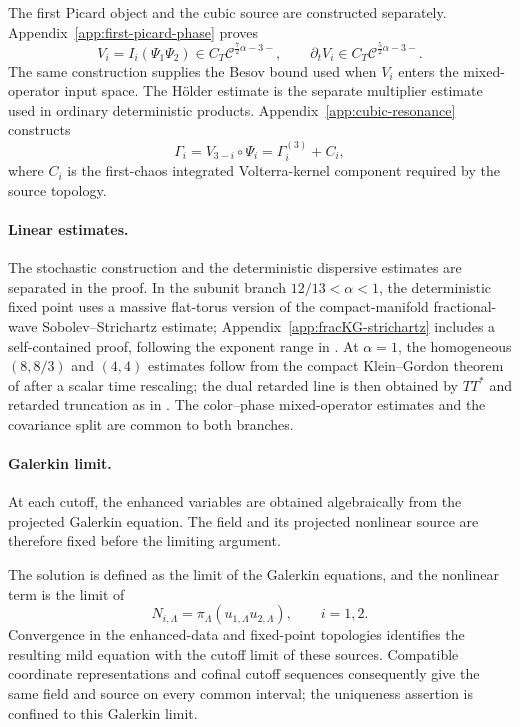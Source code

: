 \documentclass[10pt]{amsart}
\numberwithin{equation}{section}
\theoremstyle{plain}
\theoremstyle{definition}
\theoremstyle{remark}
\begin{document}
The first Picard object and the cubic source are constructed separately.  Appendix~\ref{app:first-picard-phase} proves
\[
        V_i=I_i(\Psi_1\Psi_2)\in C_T\mathcal C^{\frac72\alpha-3-},
        \qquad
        \partial_tV_i\in C_T\mathcal C^{\frac52\alpha-3-}.
\]
The same construction supplies the Besov bound used when $V_i$ enters the mixed-operator input space.  The H\"older estimate is the separate multiplier estimate used in ordinary deterministic products.  Appendix~\ref{app:cubic-resonance} constructs
\[
        \Gamma_i=V_{3-i}\circ\Psi_i=\Gamma_i^{(3)}+C_i,
\]
where $C_i$ is the first-chaos integrated Volterra-kernel component required by the source topology.

\paragraph{Linear estimates.}
The stochastic construction and the deterministic dispersive estimates are separated in the proof.  In the subunit branch $12/13<\alpha<1$, the deterministic fixed point uses a massive flat-torus version of the compact-manifold fractional-wave Sobolev--Strichartz estimate; Appendix~\ref{app:fracKG-strichartz} includes a self-contained proof, following the exponent range in \cite{Dinh}.  At $\alpha=1$, the homogeneous $(8,8/3)$ and $(4,4)$ estimates follow from the compact Klein--Gordon theorem of \cite{CacciafestaDanesiMeng} after a scalar time rescaling; the dual retarded line is then obtained by $TT^*$ and retarded truncation as in \cite{KeelTao,GKO}.  The color--phase mixed-operator estimates and the covariance split are common to both branches.

\paragraph{Galerkin limit.}
At each cutoff, the enhanced variables are obtained algebraically from the projected Galerkin equation.  The field and its projected nonlinear source are therefore fixed before the limiting argument.

The solution is defined as the limit of the Galerkin equations, and the nonlinear term is the limit of
\[
        N_{i,\Lambda}=\pi_\Lambda(u_{1,\Lambda}u_{2,\Lambda}),
        \qquad i=1,2.
\]
Convergence in the enhanced-data and fixed-point topologies identifies the resulting mild equation with the cutoff limit of these sources.  Compatible coordinate representations and cofinal cutoff sequences consequently give the same field and source on every common interval; the uniqueness assertion is confined to this Galerkin limit.
\end{document}
